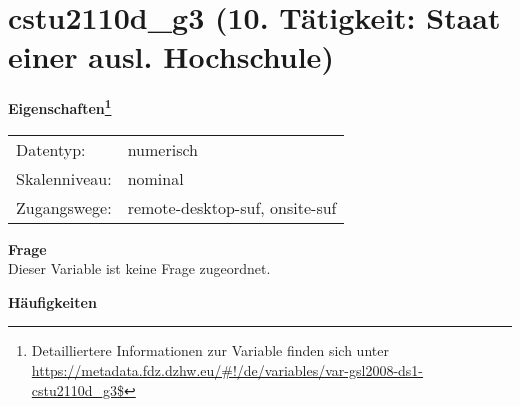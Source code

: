 
    \setcounter{footnote}{0}

    \vspace*{-1.8cm}
	\section{cstu2110d\_g3 (10. Tätigkeit: Staat einer ausl. Hochschule)}
	\label{section:cstu2110d_g3}



    \vspace*{0.5cm}
    \noindent\textbf{Eigenschaften\footnote{Detailliertere Informationen zur Variable finden sich unter
		\url{https://metadata.fdz.dzhw.eu/\#!/de/variables/var-gsl2008-ds1-cstu2110d_g3$}}}\\
	\begin{tabularx}{\hsize}{@{}lX}
	Datentyp: & numerisch \\
	Skalenniveau: & nominal \\
	Zugangswege: &
	  remote-desktop-suf, 
	  onsite-suf
 \\
    \end{tabularx}



		\vspace*{0.5cm}
		\noindent\textbf{Frage}\\
		Dieser Variable ist keine Frage zugeordnet.





        		\vspace*{0.5cm}
                \noindent\textbf{Häufigkeiten}

